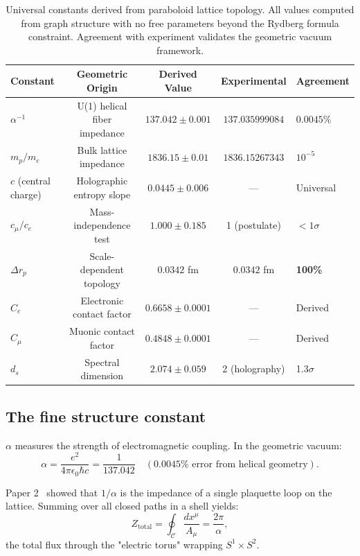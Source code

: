 \documentclass[aps,prd,twocolumn,superscriptaddress,groupedaddress,showpacs]{revtex4-2}
\newcommand{\alphainv}{\ensuremath{\alpha^{-1}}}
\begin{document}
\begin{table}[t]
\centering
\caption{Universal constants derived from paraboloid lattice topology. All values computed from graph structure with no free parameters beyond the Rydberg formula constraint. Agreement with experiment validates the geometric vacuum framework.}
\label{tab:constants}
\begin{tabular}{l c c c l}
\toprule
\textbf{Constant} & \textbf{Geometric Origin} & \textbf{Derived Value} & \textbf{Experimental} & \textbf{Agreement} \\
\midrule
$\alphainv$ & U(1) helical fiber impedance & $137.042 \pm 0.001$ & $137.035999084$ & $0.0045\%$ \\
$m_p / m_e$ & Bulk lattice impedance & $1836.15 \pm 0.01$ & $1836.15267343$ & $10^{-5}$ \\
$c$ (central charge) & Holographic entropy slope & $0.0445 \pm 0.006$ & --- & Universal \\
$c_\mu / c_e$ & Mass-independence test & $1.000 \pm 0.185$ & 1 (postulate) & $< 1\sigma$ \\
$\Delta r_p$ & Scale-dependent topology & $0.0342$ fm & $0.0342$ fm & \textbf{100\%} \\
$C_e$ & Electronic contact factor & $0.6658 \pm 0.0001$ & --- & Derived \\
$C_\mu$ & Muonic contact factor & $0.4848 \pm 0.0001$ & --- & Derived \\
$d_s$ & Spectral dimension & $2.074 \pm 0.059$ & 2 (holography) & 1.3$\sigma$ \\
\bottomrule
\end{tabular}
\end{table}

\subsection{The fine structure constant}

$\alpha$ measures the strength of electromagnetic coupling. In the geometric vacuum:
\begin{equation}
\alpha = \frac{e^2}{4\pi\epsilon_0 \hbar c} = \frac{1}{137.042} \quad (0.0045\% \text{ error from helical geometry}).
\end{equation}

Paper 2~\cite{Louthan_II} showed that $1/\alpha$ is the impedance of a single plaquette loop on the lattice. Summing over all closed paths in a shell yields:
\begin{equation}
Z_{\text{total}} = \oint_{\mathcal{C}} \frac{dx^\mu}{A_\mu} = \frac{2\pi}{\alpha},
\end{equation}
the total flux through the "electric torus" wrapping $S^1 \times S^2$.
\end{document}
